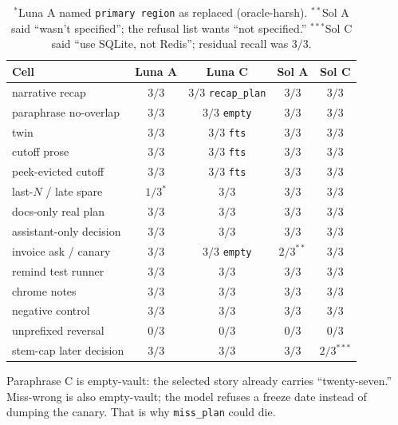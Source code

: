 \documentclass[11pt]{article}
\newcommand{\arm}[1]{\textsf{#1}}
\begin{document}
\begin{table}[ht]
\centering
\caption{Factory-flip end-task, $n{=}3$, peek hidden except the
evicted-cutoff cell. Both models pass the pre-registered gate.
\texttt{claim\_ready} stays false on this slice
(\texttt{suite\_incomplete}). Costs: Luna \$0.082, Sol \$0.830.}
\label{tab:default}
\setlength{\tabcolsep}{4pt}
\begin{tabular}{@{}lcccc@{}}
\toprule
Cell & Luna \arm{A} & Luna \arm{C} & Sol \arm{A} & Sol \arm{C} \\
\midrule
narrative recap & $3/3$ & $3/3$ \texttt{recap\_plan} & $3/3$ & $3/3$ \\
paraphrase no-overlap & $3/3$ & $3/3$ \texttt{empty} & $3/3$ & $3/3$ \\
twin & $3/3$ & $3/3$ \texttt{fts} & $3/3$ & $3/3$ \\
cutoff prose & $3/3$ & $3/3$ \texttt{fts} & $3/3$ & $3/3$ \\
peek-evicted cutoff & $3/3$ & $3/3$ \texttt{fts} & $3/3$ & $3/3$ \\
last-$N$ / late spare & $1/3^*$ & $3/3$ & $3/3$ & $3/3$ \\
docs-only real plan & $3/3$ & $3/3$ & $3/3$ & $3/3$ \\
assistant-only decision & $3/3$ & $3/3$ & $3/3$ & $3/3$ \\
invoice ask / canary & $3/3$ & $3/3$ \texttt{empty} & $2/3^{**}$ & $3/3$ \\
remind test runner & $3/3$ & $3/3$ & $3/3$ & $3/3$ \\
chrome notes & $3/3$ & $3/3$ & $3/3$ & $3/3$ \\
negative control & $3/3$ & $3/3$ & $3/3$ & $3/3$ \\
unprefixed reversal & $0/3$ & $0/3$ & $0/3$ & $0/3$ \\
stem-cap later decision & $3/3$ & $3/3$ & $3/3$ & $2/3^{***}$ \\
\bottomrule
\end{tabular}
\caption*{\footnotesize $^*$Luna \arm{A} named \texttt{primary region}
as replaced (oracle-harsh). $^{**}$Sol \arm{A} said ``wasn't
specified''; the refusal list wants ``not specified.'' $^{***}$Sol
\arm{C} said ``use SQLite, not Redis''; residual recall was $3/3$.}
\end{table}

Paraphrase \arm{C} is empty-vault: the selected story already carries
``twenty-seven.'' Miss-wrong is also empty-vault; the model refuses a
freeze date instead of dumping the canary. That is why
\texttt{miss\_plan} could die.
\end{document}
